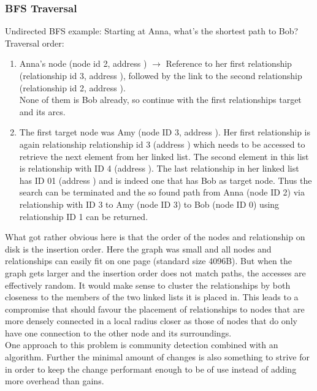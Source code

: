 \documentclass[a4paper,10pt]{article}
\begin{document}
        \subsubsection{BFS Traversal}
            Undirected BFS example: Starting at Anna, what's the shortest path to Bob? \\
            Traversal order:
            \begin{enumerate}
                \item Anna's node (node id 2, address ) $\rightarrow$ Reference to her first relationship (relationship id 3, address ), followed by the link to the second relationship (relationship id 2, address ). \\
             None of them is Bob already, so continue with the first relationships target and its arcs.
         \item The first target node was Amy (node ID 3, address ). Her first relationship is again relationship relationship id 3 (address ) which needs to be accessed to retrieve the next element from her linked list.
             The second element in this list is relationship with ID 4 (address ). 
                    The last relationship in her linked list has ID 01 (address ) and is indeed one that has Bob as target node. 
                    Thus the search can be terminated and the so found path from Anna (node ID 2) via relationship with ID 3 to Amy (node ID 3) to Bob (node ID 0) using relationship ID 1 can be returned.
            \end{enumerate}
            What got rather obvious here is that the order of the nodes and relationship on disk is the insertion order.
            Here the graph was small and all nodes and relationships can easily fit on one page (standard size 4096B). 
            But when the graph gets larger and the insertion order does not match paths, the accesses are effectively random. 
            It would make sense to cluster the relationships by both closeness to the members of the two linked lists it is placed in. 
            This leads to a compromise that should favour the placement of relationships to nodes that are more densely connected in a local radius closer as those of nodes that do only have one connection to the other node and its surroundings. \\
            One approach to this problem is community detection combined with an algorithm. 
            Further the minimal amount of changes is also something to strive for in order to keep the change performant enough to be of use instead of adding more overhead than gains. 
            
\end{document}
